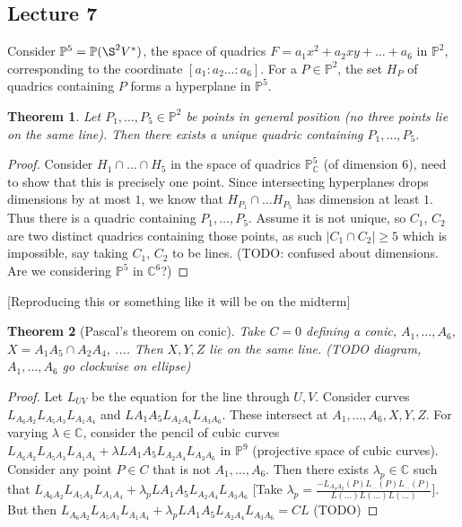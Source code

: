 \documentclass[12pt]{article}
\newcommand{\C}{\mathbb{C}}
\renewcommand{\P}{\mathbb{P}}
\newtheorem{theorem}{Theorem}
\begin{document}
    \subsection{Lecture 7}
    Consider $\P^5 = \P(\S^2V^*)$, the space of quadrics $F = a_1x^2 + a_2xy + \dots + a_6$ in $\P^2$, corresponding to the coordinate $[a_1:a_2\dots :a_6]$. For a $P \in \P^2$, the set $H_P$ of quadrics containing $P$ forms a hyperplane in $\P^5$. \par 
    [The proof of this will probably be on the exam]
    \begin{theorem}
        Let $P_1, \dots, P_5 \in \P^2$ be points in general position (no three points lie on the same line). Then there exists a unique quadric containing $P_1, \dots, P_5$. 
    \end{theorem}
    \begin{proof}
        Consider $H_1 \cap \dots \cap H_5$ in the space of quadrics $\P_\C^5$ (of dimension $6$), need to show that this is precisely one point. Since intersecting hyperplanes drops dimensions by at most $1$, we know that $H_{P_1} \cap \dots H_{P_5}$ has dimension at least $1$. Thus there is a quadric containing $P_1, \dots, P_5$. Assume it is not unique, so $C_1$, $C_2$ are two distinct quadrics containing those points, as such $|C_1 \cap C_2| \geq 5$ which is impossible, say taking $C_1$, $C_2$ to be lines. (TODO: confused about dimensions. Are we considering $\P^5$ in $\C^6$?)
    \end{proof}
    [Reproducing this or something like it will be on the midterm]
    \begin{theorem}
        [Pascal's theorem on conic] Take $C = 0$ defining a conic, $A_1, \dots, A_6$, $X = A_1A_5 \cap A_2A_4$, .... Then $X, Y, Z$ lie on the same line. (TODO diagram, $A_1, \dots, A_6$ go clockwise on ellipse)
    \end{theorem}
    \begin{proof}
        Let $L_{UV}$ be the equation for the line through $U, V$. Consider curves $L_{A_6A_2}L_{A_5A_3}L_{A_1A_4}$ and $L{A_1A_5}L_{A_2A_4}L_{A_3A_6}$. These intersect at $A_1, \dots, A_6, X, Y, Z$. For varying $\lambda \in \C$, consider the pencil of cubic curves $L_{A_6A_2}L_{A_5A_3}L_{A_1A_4} + \lambda L{A_1A_5}L_{A_2A_4}L_{A_3A_6}$ in $\P^9$ (projective space of cubic curves). Consider any point $P \in C$ that is not $A_1, \dots, A_6$. Then there exists $\lambda_p \in \C$ such that $L_{A_6A_2}L_{A_5A_3}L_{A_1A_4} + \lambda_p L{A_1A_5}L_{A_2A_4}L_{A_3A_6}$ [Take $\lambda_p = \frac{-L_{A_4A_2}(P)L_{...}(P)L_{...}(P)}{L(...)L(...)L(...)}$]. But then $L_{A_6A_2}L_{A_5A_3}L_{A_1A_4} + \lambda_p L{A_1A_5}L_{A_2A_4}L_{A_3A_6} = CL$ (TODO)
    \end{proof}
\end{document}
